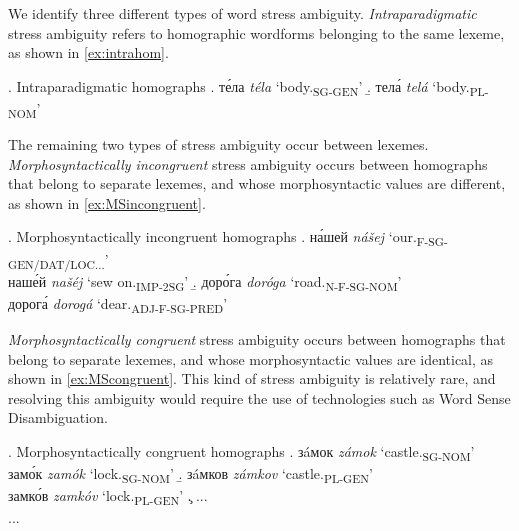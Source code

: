\documentclass[11pt]{article}
\newcommand{\rus}[1]{\foreignlanguage{russian}{#1}}
\newcommand{\rr}[1]{\marginpar{\scriptsize R: #1}} %
\begin{document}
We identify three different types of word stress ambiguity.
\emph{Intraparadigmatic} stress ambiguity refers
to homographic wordforms belonging to the same lexeme, as shown in 
\ref{ex:intrahom}. 

\ex. Intraparadigmatic homographs \label{ex:intrahom}
\a. \rus{т\'{е}ла} \emph{t\'{e}la} `body.\textsubscript{SG-GEN}' 
    \label{ex:bodySGGEN}
\b. \rus{тел\'{а}} \emph{tel\'{a}} `body.\textsubscript{PL-NOM}' 
    \label{ex:bodyPLNOM}

The remaining two types of stress ambiguity occur between lexemes. 
\emph{Morphosyntactically incongruent} stress ambiguity occurs between homographs
that belong to separate lexemes, and whose morphosyntactic values are different, 
as shown in \ref{ex:MSincongruent}.

\ex. Morphosyntactically incongruent homographs \label{ex:MSincongruent}
\a. \rus{н\'{а}шей} \emph{nášej} `our.\textsubscript{F-SG-GEN/DAT/LOC...}'\\
    \rus{наш\'{е}й} \emph{našéj} `sew on.\textsubscript{IMP-2SG}'
\b. \rus{дор\'{о}га} \emph{doróga} `road.\textsubscript{N-F-SG-NOM}'\\
    \rus{дорог\'{а}} \emph{dorogá} `dear.\textsubscript{ADJ-F-SG-PRED}'

\emph{Morphosyntactically congruent} stress ambiguity occurs between homographs 
that belong to separate lexemes, 
and whose morphosyntactic values are identical, as shown in
\ref{ex:MScongruent}. This kind of stress ambiguity is relatively rare, and resolving this ambiguity would require the use of technologies such as Word Sense Disambiguation.

\ex. Morphosyntactically congruent homographs \label{ex:MScongruent}
\a. \rus{з\'{a}мок} \emph{z\'{a}mok} `castle.\textsubscript{SG-NOM}'\\
	\rus{зам\'{о}к} \emph{zam\'{o}k} `lock.\textsubscript{SG-NOM}'
\b. \rus{з\'{a}мков} \emph{z\'{a}mkov} `castle.\textsubscript{PL-GEN}'\\
	\rus{замк\'{о}в} \emph{zamk\'{o}v} `lock.\textsubscript{PL-GEN}'
\c. ...\\
	...
\end{document}

